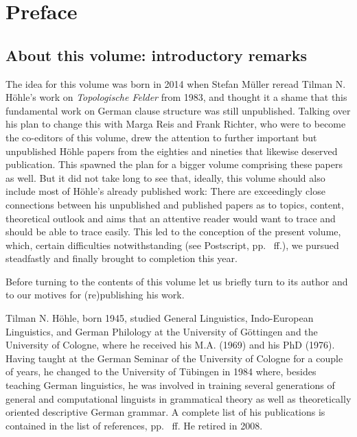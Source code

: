 
\chapter{Preface}


\section*{About this volume: introductory remarks}

\begin{refsection}

The idea for this volume was born in 2014 when Stefan Müller reread Tilman N. Höhle's work on
\emph{Topologische Felder} from 1983, and thought it a shame that this fundamental work on German clause
structure was still unpublished. Talking over his plan to change this with Marga Reis and Frank
Richter, who were to become the co-editors of this volume, drew the attention to further important
but unpublished Höhle papers from the eighties and nineties that likewise deserved publication. This
spawned the plan for a bigger volume comprising these papers as well. But it did not take long to
see that, ideally, this volume should also include most of Höhle's already published work: There
are exceedingly close connections between his unpublished and published papers as to topics,
content, theoretical outlook and aims that an attentive reader would want to trace and should be
able to trace easily. This led to the conception of the present volume, which, certain difficulties
notwithstanding (see Postscript, pp.~\pageref{page-postscript} ff.), we pursued steadfastly and finally brought to completion this year. 

\medskip
Before turning to the contents of this volume let us briefly turn to its author and to our motives for (re)publishing his work.  

Tilman N. Höhle, born 1945, studied General Linguistics, Indo-European Linguistics, and German
Philology at the University of Göttingen and the University of Cologne, where he received his
M.A. (1969) and his PhD (1976). Having taught at the German Seminar of the University of Cologne for
a couple of years, he changed to the University of Tübingen in 1984 where, besides teaching German
linguistics, he was involved in training several generations of general and computational linguists
in grammatical theory as well as theoretically oriented descriptive German grammar. A complete list
of his publications is contained in the list of references, pp.~\pageref{page-hoehle-refs} ff. He retired in 2008.


\end{refsection}
